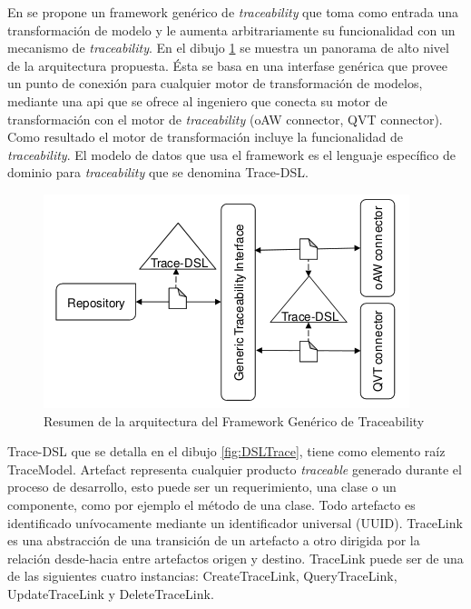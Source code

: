 \documentclass[a4paper,12pt,twoside,spanish,openright]{book}
\begin{document}
En \cite{GrammelKastenholz} se propone un framework genérico de \textit{traceability} que toma como entrada una transformación de modelo y le aumenta arbitrariamente su funcionalidad con un mecanismo de \textit{traceability}. En el dibujo \ref{fig:GenericoArquitectura} se muestra un panorama de alto nivel de la arquitectura propuesta. Ésta se basa en una interfase genérica que provee un punto de conexión para cualquier motor de transformación de modelos, mediante una \gls{api} que se ofrece al ingeniero que conecta su motor de transformación con el motor de \textit{traceability} (\textsf{oAW connector}, \textsf{QVT connector}). Como resultado el motor de transformación incluye la funcionalidad de \textit{traceability}. El modelo de datos que usa el framework es el lenguaje específico de dominio para \textit{traceability} que se denomina \textsf{Trace-DSL}.

\begin{figure}[hbtp]
\centering
\includegraphics[scale=.7]{./img/GenericTraceFrame_Arquitectura}
\caption{Resumen de la arquitectura del Framework Genérico de Traceability}
\label{fig:GenericoArquitectura}
\end{figure}


\textsf{Trace-DSL} que se detalla en el dibujo \ref{fig:DSLTrace}, tiene como elemento raíz \textsf{TraceModel}. \textsf{Artefact} representa cualquier producto \textit{traceable} generado durante el proceso de desarrollo, esto puede ser un requerimiento, una clase o un componente, como por ejemplo el método de una clase. Todo artefacto es identificado unívocamente mediante un identificador universal (\textsf{UUID}). \textsf{TraceLink} es una abstracción de una transición de un artefacto a otro dirigida por la relación desde-hacia entre artefactos origen y destino. \textsf{TraceLink} puede ser de una de las siguientes cuatro instancias: \textsf{CreateTraceLink}, \textsf{QueryTraceLink}, \textsf{UpdateTraceLink} y \textsf{DeleteTraceLink}.
\end{document}
